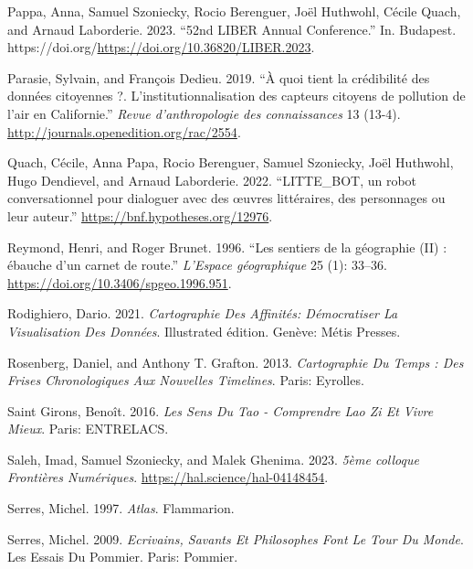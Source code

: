 \documentclass[
  letterpaper,
  DIV=11,
  numbers=noendperiod]{scrreprt}
\newlength{\cslhangindent}
\newlength{\cslentryspacingunit} %
\newenvironment{CSLReferences}[2] %
 {%
  \setlength{\parindent}{0pt}
  \ifodd #1
  \let\oldpar\par
  \def\par{\hangindent=\cslhangindent\oldpar}
  \fi
  \setlength{\parskip}{#2\cslentryspacingunit}
 }%
 {}
\begin{document}
\begin{CSLReferences}{1}{0}
\leavevmode{}%
Pappa, Anna, Samuel Szoniecky, Rocio Berenguer, Joël Huthwohl, Cécile
Quach, and Arnaud Laborderie. 2023. {``52nd LIBER Annual Conference.''}
In. Budapest. https://doi.org/\url{https://doi.org/10.36820/LIBER.2023}.

\leavevmode{}%
Parasie, Sylvain, and François Dedieu. 2019. {``À quoi tient la
crédibilité des données citoyennes ?. L{'}institutionnalisation des
capteurs citoyens de pollution de l{'}air en Californie.''} \emph{Revue
d{'}anthropologie des connaissances} 13 (13-4).
\url{http://journals.openedition.org/rac/2554}.

\leavevmode{}%
Quach, Cécile, Anna Papa, Rocio Berenguer, Samuel Szoniecky, Joël
Huthwohl, Hugo Dendievel, and Arnaud Laborderie. 2022. {``LITTE{\_}BOT,
un robot conversationnel pour dialoguer avec des {œ}uvres littéraires,
des personnages ou leur auteur.''}
\url{https://bnf.hypotheses.org/12976}.

\leavevmode{}%
Reymond, Henri, and Roger Brunet. 1996. {``Les sentiers de la géographie
(II) : ébauche d'un carnet de route.''} \emph{L'Espace géographique} 25
(1): 33--36. \url{https://doi.org/10.3406/spgeo.1996.951}.

\leavevmode{}%
Rodighiero, Dario. 2021. \emph{Cartographie Des Affinités: Démocratiser
La Visualisation Des Données}. Illustrated édition. Genève: Métis
Presses.

\leavevmode{}%
Rosenberg, Daniel, and Anthony T. Grafton. 2013. \emph{Cartographie Du
Temps : Des Frises Chronologiques Aux Nouvelles Timelines}. Paris:
Eyrolles.

\leavevmode{}%
Saint Girons, Benoît. 2016. \emph{Les Sens Du Tao - Comprendre Lao Zi Et
Vivre Mieux}. Paris: ENTRELACS.

\leavevmode{}%
Saleh, Imad, Samuel Szoniecky, and Malek Ghenima. 2023. \emph{5ème
colloque Frontières Numériques}. \url{https://hal.science/hal-04148454}.

\leavevmode{}%
Serres, Michel. 1997. \emph{Atlas}. Flammarion.

\leavevmode{}%
Serres, Michel. 2009. \emph{Ecrivains, Savants Et Philosophes Font Le
Tour Du Monde}. Les Essais Du Pommier. Paris: Pommier.


\end{CSLReferences}
\end{document}
